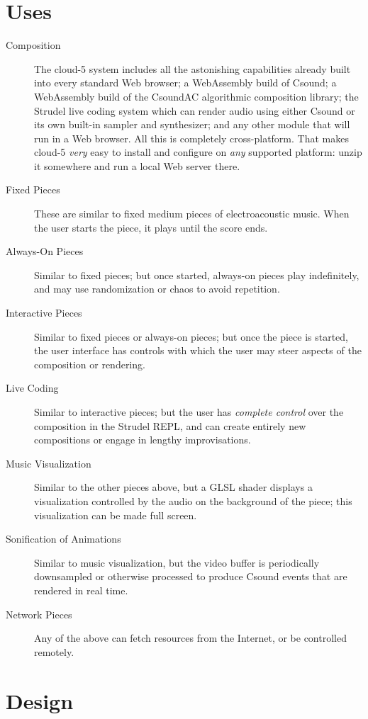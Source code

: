 \documentclass[runningheads,a4paper]{llncs}
\begin{document}
\section{Uses}

\begin{description}
\item[Composition] The cloud-5 system includes all the astonishing capabilities already built into every standard Web browser; a WebAssembly build of Csound; a WebAssembly build of the CsoundAC algorithmic composition library; the Strudel live coding system which can render audio using either Csound or its own built-in sampler and synthesizer; and any other module that will run in a Web browser. All this is completely cross-platform. That makes cloud-5 \emph{very} easy to install and configure on \emph{any} supported platform: unzip it somewhere and run a local Web server there. 
\item[Fixed Pieces] These are similar to fixed medium pieces of electroacoustic music. When the user starts the piece, it plays until the score ends. 
\item[Always-On Pieces] Similar to fixed pieces; but once started, always-on pieces play indefinitely, and may use randomization or chaos to avoid repetition.
\item[Interactive Pieces] Similar to fixed pieces or always-on pieces; but once the piece is started, the user interface has controls with which the user may steer aspects of the composition or rendering.
\item[Live Coding] Similar to interactive pieces; but the user has \emph{complete control} over the composition in the Strudel REPL, and can create entirely new compositions or engage in lengthy improvisations.
\item[Music Visualization] Similar to the other pieces above, but a GLSL shader displays a visualization controlled by the audio on the background of the piece; this visualization can be made full screen.
\item[Sonification of Animations] Similar to music visualization, but the video buffer is periodically downsampled or otherwise processed to produce Csound events that are rendered in real time.
\item[Network Pieces] Any of the above can fetch resources from the Internet, or be controlled remotely.
\end{description}

\section{Design}
\end{document}
